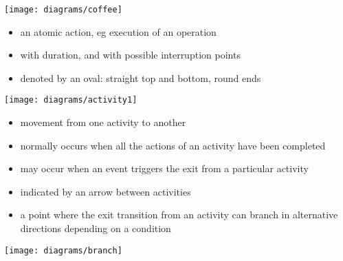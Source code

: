 \documentclass{sepslide-soa-faked} %
\begin{document}
\begin{slide}

\centerline{\texttt{[image: diagrams/coffee]}}
\end{slide}

\begin{slide}
\begin{itemize}
\item an atomic action, eg execution of an operation
\item with duration, and with possible interruption points
\item denoted by an oval: straight top and bottom, round ends
\end{itemize}
  \bigskip
  \centerline{\texttt{[image: diagrams/activity1]}} 
\end{slide}

\begin{slide}
\begin{itemize}
\item movement from one activity to another
\item normally occurs when all the actions of an activity have been
  completed
\item may occur when an event triggers the exit from a particular activity
\item indicated by an arrow between activities
\end{itemize}
\end{slide}

\begin{slide}
\begin{itemize}
\item a point where the exit
  transition from an activity can branch in alternative directions
  depending on a condition
\end{itemize}
  \bigskip
  \centerline{\texttt{[image: diagrams/branch]}}
\end{slide}
\end{document}
